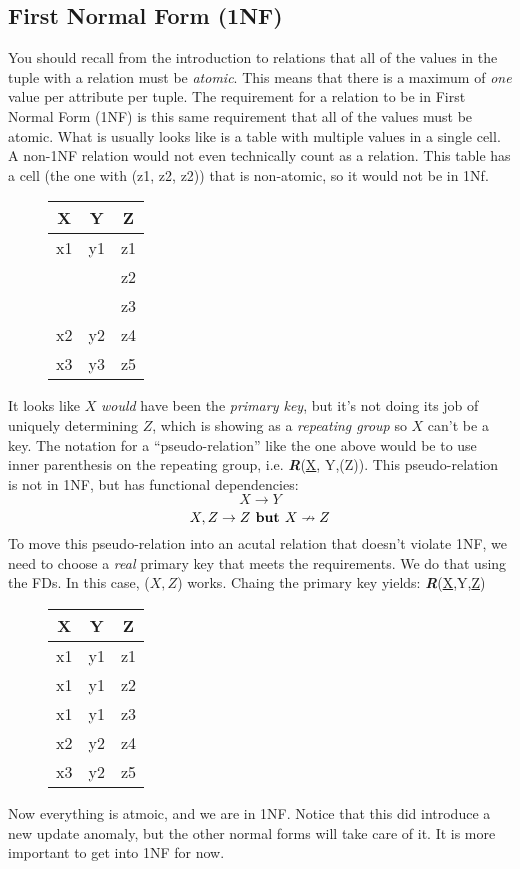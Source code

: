 \documentclass{report}
\begin{document}
\subsection{First Normal Form (1NF)}
You should recall from the introduction to relations that all of the values in the tuple with a relation must be \textit{atomic}. This means that there is a maximum of \textit{one} value per attribute per tuple.
\bigbreak \noindent
The requirement for a relation to be in First Normal Form (1NF) is this same requirement that all of the values must be atomic.
\bigbreak \noindent
What is usually looks like is a table with multiple values in a single cell. A non-1NF relation would not even technically count as a relation. This table has a cell (the one with (z1, z2, z2)) that is non-atomic, so it would not be in 1Nf.
    \begin{figure}[ht]
    \centering
     \setlength{\tabcolsep}{35}
    \begin{tabular}{ c c c}
        \hline
        X & Y & Z \\
    \hline 
    x1 & y1 & z1 \\
       & & z2 \\
       & & z3 \\
    x2 & y2 & z4 \\
    x3 &y3 & z5 \\
    \hline
    \end{tabular}
    \end{figure}
\bigbreak \noindent
It looks like $X$ \textit{would} have been the \textit{primary key}, but it's not doing its job of uniquely determining $Z$, which is showing as a \textit{repeating group} so $X$ can't be a key. The notation for a ``pseudo-relation'' like the one above would be to use inner parenthesis on the repeating group, i.e. \textit{\textbf{R}}(\underline{X}, Y,(Z)).
\bigbreak \noindent
This pseudo-relation is not in 1NF, but has functional dependencies:
$$ X \rightarrow Y $$
$$ X,Z \rightarrow Z \text{\textbf{ but }} X \nrightarrow Z$$
To move this pseudo-relation into an acutal relation that doesn't violate 1NF, we need to choose a \textit{real} primary key that meets the requirements. We do that using the FDs. In this case, ($X,Z$) works.
\bigbreak \noindent
Chaing the primary key yields: \textit{\textbf{R}}(\underline{X},Y,\underline{Z})
    \begin{figure}[ht]
    \centering
      \setlength{\tabcolsep}{35}
    \begin{tabular}{c c c}
    \hline
    X & Y & Z \\
    \hline
    x1&y1&z1 \\
    x1& y1&z2 \\
    x1&y1&z3 \\
    x2&y2&z4 \\
    x3&y2&z5 \\
    \hline
    \end{tabular}
    \end{figure}
Now everything is atmoic, and we are in 1NF. Notice that this did introduce a new update anomaly, but the other normal forms will take care of it. It is more important to get into 1NF for now.
\end{document}
